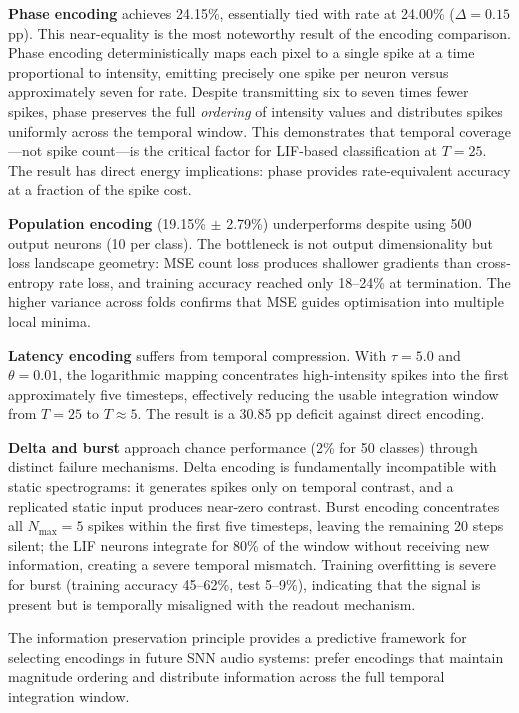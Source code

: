 \textbf{Phase encoding} achieves 24.15\%, essentially tied with rate at 24.00\% ($\Delta = 0.15$ pp). This near-equality is the most noteworthy result of the encoding comparison. Phase encoding deterministically maps each pixel to a single spike at a time proportional to intensity, emitting precisely one spike per neuron versus approximately seven for rate. Despite transmitting six to seven times fewer spikes, phase preserves the full \emph{ordering} of intensity values and distributes spikes uniformly across the temporal window. This demonstrates that temporal coverage---not spike count---is the critical factor for LIF-based classification at $T = 25$. The result has direct energy implications: phase provides rate-equivalent accuracy at a fraction of the spike cost.

\textbf{Population encoding} (19.15\% $\pm$ 2.79\%) underperforms despite using 500 output neurons (10 per class). The bottleneck is not output dimensionality but loss landscape geometry: MSE count loss produces shallower gradients than cross-entropy rate loss, and training accuracy reached only 18--24\% at termination. The higher variance across folds confirms that MSE guides optimisation into multiple local minima.

\textbf{Latency encoding} suffers from temporal compression. With $\tau = 5.0$ and $\theta = 0.01$, the logarithmic mapping concentrates high-intensity spikes into the first approximately five timesteps, effectively reducing the usable integration window from $T = 25$ to $T \approx 5$. The result is a 30.85 pp deficit against direct encoding.

\textbf{Delta and burst} approach chance performance (2\% for 50 classes) through distinct failure mechanisms. Delta encoding is fundamentally incompatible with static spectrograms: it generates spikes only on temporal contrast, and a replicated static input produces near-zero contrast. Burst encoding concentrates all $N_\text{max} = 5$ spikes within the first five timesteps, leaving the remaining 20 steps silent; the LIF neurons integrate for 80\% of the window without receiving new information, creating a severe temporal mismatch. Training overfitting is severe for burst (training accuracy 45--62\%, test 5--9\%), indicating that the signal is present but is temporally misaligned with the readout mechanism.

The information preservation principle provides a predictive framework for selecting encodings in future SNN audio systems: prefer encodings that maintain magnitude ordering and distribute information across the full temporal integration window.

